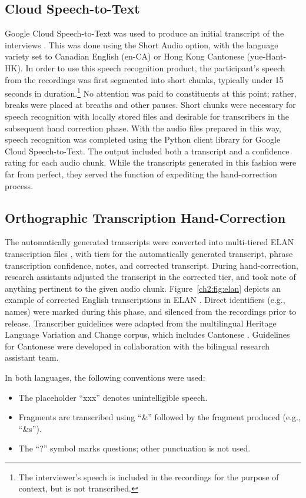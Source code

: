 \subsection{Cloud Speech-to-Text}\label{ch2:subsec:stt}
Google Cloud Speech-to-Text was used to produce an initial transcript of the interviews \citep{google_2019_stt}. This was done using the Short Audio option, with the language variety set to Canadian English (en-CA) or Hong Kong Cantonese (yue-Hant-HK). In order to use this speech recognition product, the participant's speech from the recordings was first segmented into short chunks, typically under 15 seconds in duration.\footnote{The interviewer's speech is included in the recordings for the purpose of context, but is not transcribed.} No attention was paid to constituents at this point; rather, breaks were placed at breaths and other pauses. Short chunks were necessary for speech recognition with locally stored files and desirable for transcribers in the subsequent hand correction phase. With the audio files prepared in this way, speech recognition was completed using the Python client library for Google Cloud Speech-to-Text. The output included both a transcript and a confidence rating for each audio chunk. While the transcripts generated in this fashion were far from perfect, they served the function of expediting the hand-correction process.

\subsection{Orthographic Transcription Hand-Correction}\label{ch2:subsec:orthographic}
The automatically generated transcripts were converted into multi-tiered ELAN transcription files \citep{sloetjes_2008_elan}, with tiers for the automatically generated transcript, phrase transcription confidence, notes, and corrected transcript. During hand-correction, research assistants adjusted the transcript in the corrected tier, and took note of anything pertinent to the given audio chunk. Figure~\ref{ch2:fig:elan} depicts an example of corrected English transcriptions in ELAN \citep{sloetjes_2008_elan}. Direct identifiers (e.g., names) were marked during this phase, and silenced from the recordings prior to release. Transcriber guidelines were adapted from the multilingual Heritage Language Variation and Change corpus, which includes Cantonese \citep{nagy_2011_hlvc}. Guidelines for Cantonese were developed in collaboration with the bilingual research assistant team.

In both languages, the following conventions were used:
\begin{itemize}
 \item The placeholder ``xxx'' denotes unintelligible speech.
 \item Fragments are transcribed using ``\&'' followed by the fragment produced (e.g., ``\&s'').
 \item The ``?'' symbol marks questions; other punctuation is not used.
\end{itemize}

